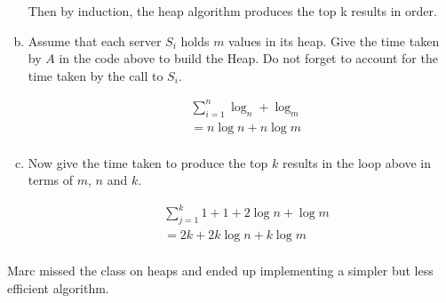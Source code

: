 \documentclass[12pt]{article}
\begin{document}
\begin{enumerate}[(a)]
Then by induction, the heap algorithm produces the top k results in order.

\item Assume that each server $S_i$ holds $m$ values in its heap. Give the time taken
by $A$ in the code above to build the Heap. Do not forget to account for the time
taken by the call to $S_i$.


\begin{align*}
  &\sum_{i=1}^n \log_n + \log_m\\
  &=n\log n + n\log m\\
\end{align*}

\item  Now give the time taken
to produce the top $k$ results in the loop above in terms of $m$, $n$ and $k$.

\begin{align*}
  &\sum_{j=1}^k 1 + 1 + 2\log n + \log m\\
  &= 2k + 2k\log n + k\log m\\
\end{align*}
\setcounter{saveenum}{\value{enumi}}
\end{enumerate}
Marc missed the class on heaps and ended up implementing a simpler but less efficient
algorithm.
\end{document}
